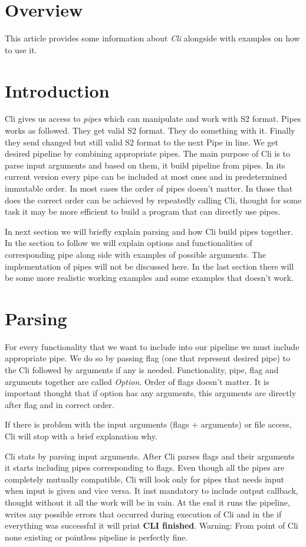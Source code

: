 \documentclass[english]{article}
\begin{document}
\section{Overview}

This article provides some information about \textit{Cli} alongside with examples on how to use it.

\section{Introduction}

Cli gives us access to \textit{pipes} which can manipulate and work with S2 format. Pipes works as followed. They get valid S2 format. They do something with it. Finally they send changed but still valid S2 format to the next Pipe in line. We get desired pipeline by combining appropriate pipes.
The main purpose of Cli is to parse input arguments and based on them, it build pipeline from pipes. In its current version every pipe can be included at most ones and in predetermined immutable order. In most cases the order of pipes doesn't matter. In those that does the correct order can be achieved by repeatedly calling Cli, thought for some task it may be more efficient to build a program that can directly use pipes.

In next section we will briefly explain parsing and how Cli build pipes together.
In the section to follow we will explain options and functionalities of corresponding pipe along side with examples of possible arguments. The implementation of pipes will not be discussed here.
In the last section there will be some more realistic working examples and some examples that doesn't work. 

\section{Parsing}
For every functionality that we want to include into our pipeline we must include appropriate pipe. We do so by passing flag (one that represent desired pipe) to the Cli followed by arguments if any is needed. Functionality, pipe, flag and arguments together are called \textit{Option}. Order of flags doesn't matter. It is important thought that if option has any arguments, this arguments are directly after flag and in correct order. 

If there is problem with the input arguments (flags + arguments) or file access, Cli will stop with a brief explanation why.

Cli stats by parsing input arguments.
After Cli parses flags and their arguments it starts including pipes corresponding to flags. Even though all the pipes are completely mutually compatible, Cli will look only for pipes that needs input when input is given and vice versa. It inst mandatory to include output callback, thought without it all the work will be in vain. At the end it runs the pipeline, writes any possible errors that occurred during execution of Cli and in the if everything was successful it will print \textbf{CLI finished}.
Warning: From point of Cli none existing or pointless pipeline is perfectly fine.
\end{document}
